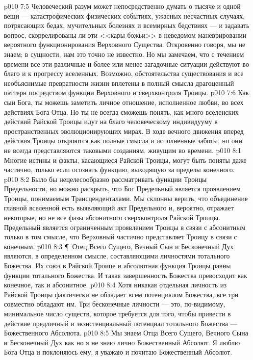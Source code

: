 \vs p010 7:5 Человеческий разум может непосредственно думать о тысяче и одной вещи --- катастрофических физических событиях, ужасных несчастных случаях, потрясающих бедах, мучительных болезнях и всемирных бедствиях --- и задавать вопрос, скоррелированы ли эти <<кары божьи>> в неведомом маневрировании вероятного функционирования Верховного Существа. Откровенно говоря, мы не знаем; в сущности, нам это точно не известно. Но мы замечаем, что с течением времени все эти различные и более или менее загадочные ситуации  действуют во благо и к прогрессу вселенных. Возможно, обстоятельства существования и все необъяснимые превратности жизни вплетены в полный смысла драгоценный паттерн посредством функции Верховного и сверхконтроля Троицы.
\vs p010 7:6 Как сын Бога, ты можешь заметить личное отношение, исполненное любви, во всех действиях Бога Отца. Но ты не всегда сможешь понять, как много вселенских действий Райской Троицы идут на благо человеческому индивидууму в пространственных эволюционирующих мирах. В ходе вечного движения вперед действия Троицы откроются как полные смысла и исполненные заботы, но они не всегда представляются таковыми созданиям, живущим во времени.
\vs p010 8:1 Многие истины и факты, касающиеся Райской Троицы, могут быть поняты даже частично, только если осознать функцию, выходящую за пределы конечного.
\vs p010 8:2 Было бы нецелесообразно рассматривать функции Троицы Предельности, но можно раскрыть, что Бог Предельный является проявлением Троицы, понимаемым Трансценденталами. Мы склонны верить, что объединение главной вселенной есть выявляющий акт Предельного и, вероятно, отражает некоторые, но не все фазы абсонитного сверхконтроля Райской Троицы. Предельный является ограниченным проявлением Троицы в связи с абсонитным только в том смысле, что Верховный частично представляет Троицу в связи с конечным.
\vs p010 8:3 \P\ Отец Всего Сущего, Вечный Сын и Бесконечный Дух являются, в определенном смысле, составляющими личностями тотального Божества. Их союз в Райской Троице и абсолютная функция Троицы равны функции тотального Божества. И такая завершенность Божества превосходит как конечное, так и абсонитное.
\vs p010 8:4 Хотя никакая отдельная личность из Райской Троицы фактически не обладает всем потенциалом Божества, все три совместно обладают им. Три бесконечные личности --- это, по\hyp{}видимому, минимальное число существ, которое требуется для того, чтобы привести в действие предличный и экзистенциальный потенциал тотального Божества --- Божественного Абсолюта.
\vs p010 8:5 Мы знаем Отца Всего Сущего, Вечного Сына и Бесконечный Дух как  но я не знаю лично Божественный Абсолют. Я люблю Бога Отца и поклоняюсь ему; я уважаю и почитаю Божественный Абсолют.
